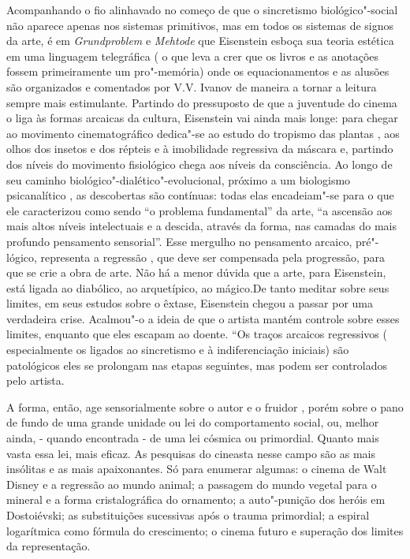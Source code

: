 Acompanhando o fio alinhavado no começo de que o sincretismo
biológico"-social não aparece apenas nos sistemas primitivos, mas em
todos os sistemas de signos da arte, é em \emph{Grundproblem} e
\emph{Mehtode} que Eisenstein esboça sua teoria estética em uma
linguagem telegráfica ( o que leva a crer que os livros e as anotações
fossem primeiramente um pro"-memória) onde os equacionamentos e as
alusões são organizados e comentados por V.V. Ivanov de maneira a tornar
a leitura sempre mais estimulante. Partindo do pressuposto de que a
juventude do cinema o liga às formas arcaicas da cultura, Eisenstein vai
ainda mais longe: para chegar ao movimento cinematográfico dedica"-se ao
estudo do tropismo das plantas , aos olhos dos insetos e dos répteis e à
imobilidade regressiva da máscara e, partindo dos níveis do movimento
fisiológico chega aos níveis da consciência. Ao longo de seu caminho
biológico"-dialético"-evolucional, próximo a um biologismo psicanalítico ,
as descobertas são contínuas: todas elas encadeiam"-se para o que ele
caracterizou como sendo ``o problema fundamental'' da arte, ``a ascensão
aos mais altos níveis intelectuais e a descida, através da forma, nas
camadas do mais profundo pensamento sensorial''. Esse mergulho no
pensamento arcaico, pré"-lógico, representa a regressão , que deve ser
compensada pela progressão, para que se crie a obra de arte. Não há a
menor dúvida que a arte, para Eisenstein, está ligada ao diabólico, ao
arquetípico, ao mágico.De tanto meditar sobre seus limites, em seus
estudos sobre o êxtase, Eisenstein chegou a passar por uma verdadeira
crise. Acalmou"-o a ideia de que o artista mantém controle sobre esses
limites, enquanto que eles escapam ao doente. ``Os traços arcaicos
regressivos ( especialmente os ligados ao sincretismo e à
indiferenciação iniciais) são patológicos eles se prolongam nas etapas
seguintes, mas podem ser controlados pelo artista.

A forma, então, age sensorialmente sobre o autor e o fruidor , porém
sobre o pano de fundo de uma grande unidade ou lei do comportamento
social, ou, melhor ainda, - quando encontrada - de uma lei cósmica ou
primordial. Quanto mais vasta essa lei, mais eficaz. As pesquisas do
cineasta nesse campo são as mais insólitas e as mais apaixonantes. Só
para enumerar algumas: o cinema de Walt Disney e a regressão ao mundo
animal; a passagem do mundo vegetal para o mineral e a forma
cristalográfica do ornamento; a auto"-punição dos heróis em Dostoiévski;
as substituições sucessivas após o trauma primordial; a espiral
logarítmica como fórmula do crescimento; o cinema futuro e superação dos
limites da representação.

